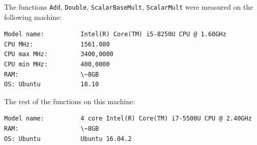 \documentclass[a4paper]{scrartcl}
\begin{document}

The functions \verb+Add+, \verb+Double+, \verb+ScalarBaseMult+, \verb+ScalarMult+ were measured on the following machine:
\begin{lstlisting}[caption=Hardware specifications of the machine A, captionpos=b]
Model name:          Intel(R) Core(TM) i5-8250U CPU @ 1.60GHz
CPU MHz:             1561.080
CPU max MHz:         3400,0000
CPU min MHz:         400,0000
RAM:                 \~8GB
OS: Ubuntu           18.10
\end{lstlisting}

The rest of the functions on this machine:
\begin{lstlisting}[caption=Hardware specifications of the machine B, captionpos=b]
Model name:          4 core Intel(R) Core(TM) i7-5500U CPU @ 2.40GHz
RAM:                 \~8GB
OS: Ubuntu           Ubuntu 16.04.2
\end{lstlisting}
\end{document}

